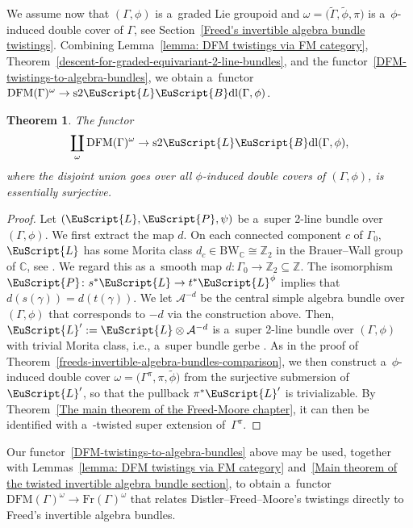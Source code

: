 \documentclass[10pt,a4paper]{amsart}
\numberwithin{equation}{section}
\newtheorem{Theorem}{Theorem}[section]
\def\mathscr#1{\EuScript{#1}}
\def\Z {\mathbb{Z}}
\def\C {\mathbb{C}}
\def\subset{\subseteq}
\newcommand{\LineBdl}{\mathscr{L}\mathscr{B}\mathrm{dl}}
\newcommand{\stwoLineBdl}{\mathrm{s}2\LineBdl}
\begin{document}
We assume now that $(\Gamma,\phi)$ is a~graded Lie groupoid and
$\omega=\bigl(\tilde\Gamma,\tilde\phi,\pi\bigr)$ is a~$\phi$-induced double cover of $\Gamma$, see Section~\ref{Freed's invertible algebra bundle twistings}. Combining Lemma~\ref{lemma: DFM twistings via FM category}, Theorem~\ref{descent-for-graded-equivariant-2-line-bundles}, and
the functor~\eqref{DFM-twistings-to-algebra-bundles}, we obtain a~functor
$\mathrm{DFM}(\Gamma)^\omega
\to
\stwoLineBdl(\Gamma,\phi)$.

\begin{Theorem}
\label{freed-distler-moore-comparison}
The functor
\begin{equation*}
\coprod_{\omega}\mathrm{DFM}(\Gamma)^\omega\to \stwoLineBdl(\Gamma,\phi),
\end{equation*}
where the disjoint union goes over all $\phi$-induced double covers of $(\Gamma,\phi)$, is essentially surjective.
\end{Theorem}

\begin{proof}
Let $(\mathscr{L},\mathscr{P},\psi)$ be a~super 2-line bundle over $(\Gamma,\phi)$. We first extract the map $d$. On each connected component $c$ of $\Gamma_0$, $\mathscr{L}$ has some Morita class $d_c \in \mathrm{BW}_{\C}\cong \Z_2$ in the Brauer--Wall group of $\C$, see \cite[Section~3.1]{Kristel2020}.
We regard this as a~smooth map $d \colon \Gamma_0 \to \Z_2 \subset \Z$. The isomorphism~${\mathscr{P}\colon s^{*}\mathscr{L} \to t^{*}\mathscr{L}^{\phi}}$ implies that $d(s(\gamma))= d(t(\gamma))$. %
We let $\mathcal{A}^{-d}$ be the central simple algebra bundle over $(\Gamma,\phi)$ that corresponds to $-d$ via the construction above.
Then, $\mathscr{L}':=\mathscr{L} \otimes \mathcal{A}^{-d}$ is a~super 2-line bundle over $(\Gamma,\phi)$ with trivial Morita class, i.e., a~super bundle gerbe \cite[Proposition~3.2.4]{Kristel2020}. As in the proof of Theorem~\ref{freeds-invertible-algebra-bundles-comparison}, we then construct a~$\phi$-induced double cover $\omega=\bigl(\Gamma^{\pi},\pi,\tilde\phi\bigr)$ from the surjective submersion of $\mathscr{L}'$, so that the pullback $\pi^{*}\mathscr{L}'$ is trivializable. By Theorem~\ref{The main theorem of the Freed-Moore chapter}, it can then be identified with a~\smash{$\tilde\phi$}-twisted super extension of~$\Gamma^{\pi}$.
\end{proof}

\begin{Remark}
Our functor~\eqref{DFM-twistings-to-algebra-bundles} above may be used, together with Lemmas~\ref{lemma: DFM twistings via FM category} and~\ref{Main theorem of the twisted invertible algebra bundle section}, to obtain a~functor
$
\mathrm{DFM}(\Gamma)^\omega \to \mathrm{Fr}(\Gamma)^{\omega}
$
that relates Distler--Freed--Moore's twistings directly to Freed's invertible algebra bundles.
\end{Remark}
\end{document}
